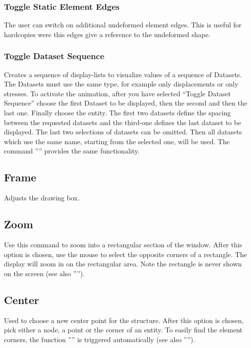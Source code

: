 \documentclass{article}
\begin{document}
\subsubsection{\label{Toggle Static Element Edges}Toggle Static Element Edges}
The user can switch on additional undeformed element edges. This is useful for hardcopies were this edges give a reference to the undeformed shape.

\subsubsection{\label{Toggle Dataset Sequence}Toggle Dataset Sequence}
Creates a sequence of display-lists to visualize values of a sequence of Datasets. The Datasets must use the same type, for example only displacements or only stresses. To activate the animation, after you have selected ``Toggle Dataset Sequence'' choose the first Dataset to be displayed, then the second  and then the last one. Finally choose the entity. The first two datasets define the spacing between the requested datasets and the third-one defines the last dataset to be displayed. The last two selections of datasets can be omitted. Then all datasets which use the same name, starting from the selected one, will be used. The command '''' provides the same functionality. 

\subsection{\label{Frame}Frame}
Adjusts the drawing box.

\subsection{\label{Zoom}Zoom}
Use this command to zoom into a rectangular section of the window. After this option is chosen, use the mouse to select the opposite corners of a rectangle.  The display will zoom in on the rectangular area.  Note the rectangle is never shown on the screen (see also '''').

\subsection{\label{Center}Center}
Used to choose a new center point for the structure. After this option is chosen, pick either a node, a point or the corner of an entity. To easily find the element corners, the function '''' is triggered automatically (see also '''').
\end{document}
